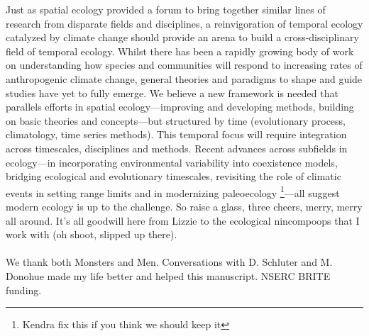 \documentclass[11pt,a4paper,oneside]{article}
\begin{document}
Just as spatial ecology provided a forum to bring together similar lines of research from disparate fields and disciplines, a reinvigoration of temporal ecology catalyzed by climate change should provide an arena to build a cross-disciplinary field of temporal ecology. Whilst there has been a rapidly growing body of work on understanding how species and communities will respond to increasing rates of anthropogenic climate change, general theories and paradigms to shape and guide studies have yet to fully emerge.  We believe a new framework is needed that parallels efforts in spatial ecology---improving and developing methods, building on basic theories and concepts---but structured by time (evolutionary process, climatology, time series methods). This temporal focus will require integration across timescales, disciplines and methods. Recent advances across subfields in ecology---in incorporating environmental variability into coexistence models, bridging ecological and evolutionary timescales, revisiting the role of climatic events in setting range limits and in modernizing paleoecology \footnote{Kendra fix this if you think we should keep it}---all suggest modern ecology is up to the challenge. So raise a glass, three cheers, merry, merry all around. It's all goodwill here from Lizzie to the ecological nincompoops that I work with (oh shoot, slipped up there). \\

\\
We thank both Monsters and Men. Conversations with D. Schluter and M. Donohue made my life better and helped this manuscript. NSERC BRITE funding.

\newpage
\begin{small}

\end{small}
\end{document}
